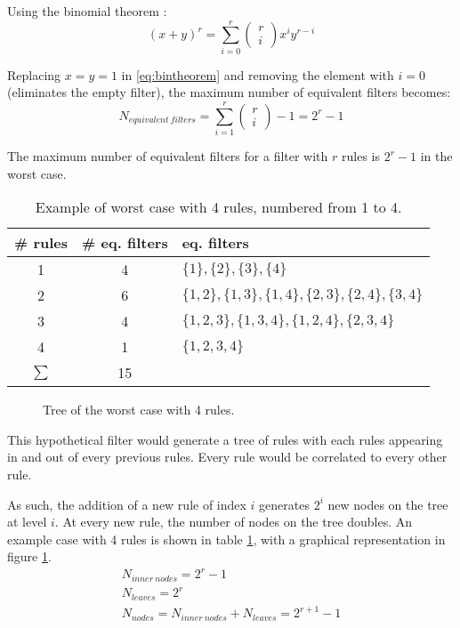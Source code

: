 Using the binomial theorem \cite{knuth1}:
\begin{equation}
	(x+y)^r=\sum_{i=0}^{r} \left( \begin{array}{l}r \\ i\end{array} \right) x^i y^{r-i}
	\label{eq:bintheorem}
\end{equation}

Replacing $x = y = 1$ in \ref{eq:bintheorem} and removing the element with $i=0$
(eliminates the empty filter), the maximum number of equivalent filters becomes:
\begin{equation}
	N_{equivalent\ filters} = \sum_{i=1}^{r} \left( \begin{array}{l}r \\ i\end{array} \right) - 1 = 2^r-1
\end{equation}

\begin{mathstatement}
	The maximum number of equivalent filters for a filter with $r$ rules is 
	$2^r-1$ in the worst case.
\end{mathstatement}

\begin{table}
	\centering
	\caption{\label{tab:piorcaso4}Example of worst case with 4 rules, numbered from 1 to 4.}
	\begin{tabular}{ccl}
		\# rules & \# eq. filters & eq. filters \\
		\hline
		1 & 4 & $\{1\}, \{2\}, \{3\}, \{4\}$ \\
		2 & 6 & $\{1, 2\}, \{1, 3\}, \{1, 4\}, \{2, 3\}, \{2, 4\}, \{3, 4\}$ \\
		3 & 4 & $\{1, 2, 3\}, \{1, 3, 4\}, \{1, 2, 4\}, \{2, 3, 4\}$ \\
		4 & 1 & $\{1, 2, 3, 4\}$ \\
		\hline
		$\sum$ & 15
	\end{tabular}
\end{table}


\begin{figure}
	\centering
	\caption{\label{fig:piorcaso4arvore}Tree of the worst case with 4 rules.}
\end{figure}

This hypothetical filter would generate a tree of rules with each rules
appearing in and out of every previous rules. Every rule would be correlated to
every other rule.

As such, the addition of a new rule of index $i$ generates $2^i$ new nodes on the
tree at level $i$. At every new rule, the number of nodes on the tree doubles.
An example case with 4 rules is shown in table \ref{tab:piorcaso4}, with a
graphical representation in figure \ref{fig:piorcaso4arvore}.
\begin{equation}
	\label{eq:worstCaseTreeNodes}
	\begin{array}{l}
	N_{inner\ nodes} = 2^r-1 \\
	N_{leaves} = 2^r \\
	N_{nodes} = N_{inner\ nodes} + N_{leaves} = 2^{r+1}-1 \\
	\end{array}
\end{equation}

